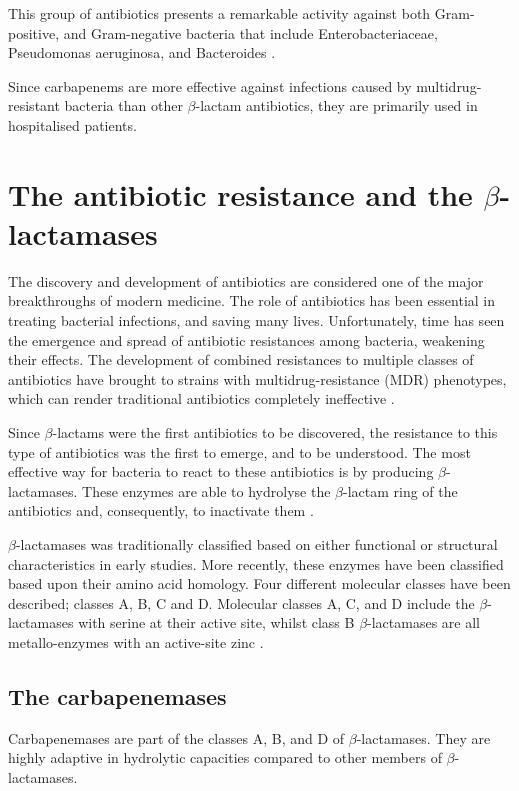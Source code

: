 \documentclass[11pt]{report}
\begin{document}
This group of antibiotics presents a remarkable activity against both Gram-positive, and Gram-negative bacteria that include Enterobacteriaceae, Pseudomonas aeruginosa, and Bacteroides \cite{Neu1985}.

Since carbapenems are more effective against infections caused by multidrug-resistant bacteria than other $\beta$-lactam antibiotics, they are primarily used in hospitalised patients.

\chapter{The antibiotic resistance and the $\beta$-lactamases}

The discovery and development of antibiotics are considered one of the major breakthroughs of modern medicine.
The role of antibiotics has been essential in treating bacterial infections, and saving many lives.
Unfortunately, time has seen the emergence and spread of antibiotic resistances among bacteria, weakening their effects.
The development of combined resistances to multiple classes of antibiotics have brought to strains with multidrug-resistance (MDR) phenotypes, which can render traditional antibiotics completely ineffective \cite{Rossolini2014}.

Since $\beta$-lactams were the first antibiotics to be discovered, the resistance to this type of antibiotics was the first to emerge, and to be understood.
The most effective way for bacteria to react to these antibiotics is by producing $\beta$-lactamases.
These enzymes are able to hydrolyse the $\beta$-lactam ring of the antibiotics and, consequently, to inactivate them \cite{kong2010beta}.

$\beta$-lactamases was traditionally classified based on either functional or structural characteristics in early studies.
More recently, these enzymes have been classified based upon their amino acid homology. Four different molecular classes have been described; classes A, B, C and D. Molecular classes A, C, and D include the $\beta$-lactamases with serine at their active site, whilst class B $\beta$-lactamases are all metallo-enzymes with an active-site zinc \cite{Queenan2007}.

\section{The carbapenemases}
Carbapenemases are part of the classes A, B, and D of $\beta$-lactamases. They are highly adaptive in hydrolytic capacities compared to other members of $\beta$-lactamases.
\end{document}
